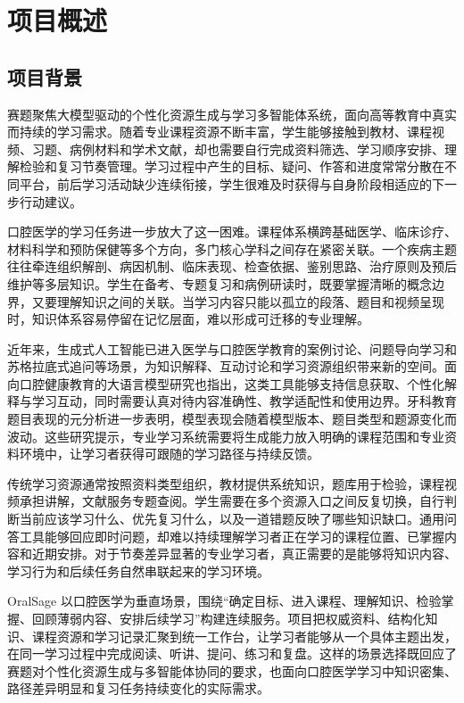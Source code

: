 
\chapter{项目概述}
\label{sec:project-overview}

\section{项目背景}

赛题聚焦大模型驱动的个性化资源生成与学习多智能体系统，面向高等教育中真实而持续的学习需求。随着专业课程资源不断丰富，学生能够接触到教材、课程视频、习题、病例材料和学术文献，却也需要自行完成资料筛选、学习顺序安排、理解检验和复习节奏管理。学习过程中产生的目标、疑问、作答和进度常常分散在不同平台，前后学习活动缺少连续衔接，学生很难及时获得与自身阶段相适应的下一步行动建议。

口腔医学的学习任务进一步放大了这一困难。课程体系横跨基础医学、临床诊疗、材料科学和预防保健等多个方向，多门核心学科之间存在紧密关联。一个疾病主题往往牵连组织解剖、病因机制、临床表现、检查依据、鉴别思路、治疗原则及预后维护等多层知识。学生在备考、专题复习和病例研读时，既要掌握清晰的概念边界，又要理解知识之间的关联。当学习内容只能以孤立的段落、题目和视频呈现时，知识体系容易停留在记忆层面，难以形成可迁移的专业理解。

近年来，生成式人工智能已进入医学与口腔医学教育的案例讨论、问题导向学习和苏格拉底式追问等场景，为知识解释、互动讨论和学习资源组织带来新的空间\cite{wei2025aipbl,liu2026socratic}。面向口腔健康教育的大语言模型研究也指出，这类工具能够支持信息获取、个性化解释与学习互动，同时需要认真对待内容准确性、教学适配性和使用边界\cite{sharmin2025oralhealthllm}。牙科教育题目表现的元分析进一步表明，模型表现会随着模型版本、题目类型和题源变化而波动\cite{doubleday2026llmaccuracy}。这些研究提示，专业学习系统需要将生成能力放入明确的课程范围和专业资料环境中，让学习者获得可跟随的学习路径与持续反馈。

传统学习资源通常按照资料类型组织，教材提供系统知识，题库用于检验，课程视频承担讲解，文献服务专题查阅。学生需要在多个资源入口之间反复切换，自行判断当前应该学习什么、优先复习什么，以及一道错题反映了哪些知识缺口。通用问答工具能够回应即时问题，却难以持续理解学习者正在学习的课程位置、已掌握内容和近期安排。对于节奏差异显著的专业学习者，真正需要的是能够将知识内容、学习行为和后续任务自然串联起来的学习环境。

OralSage 以口腔医学为垂直场景，围绕“确定目标、进入课程、理解知识、检验掌握、回顾薄弱内容、安排后续学习”构建连续服务。项目把权威资料、结构化知识、课程资源和学习记录汇聚到统一工作台，让学习者能够从一个具体主题出发，在同一学习过程中完成阅读、听讲、提问、练习和复盘。这样的场景选择既回应了赛题对个性化资源生成与多智能体协同的要求，也面向口腔医学学习中知识密集、路径差异明显和复习任务持续变化的实际需求。

